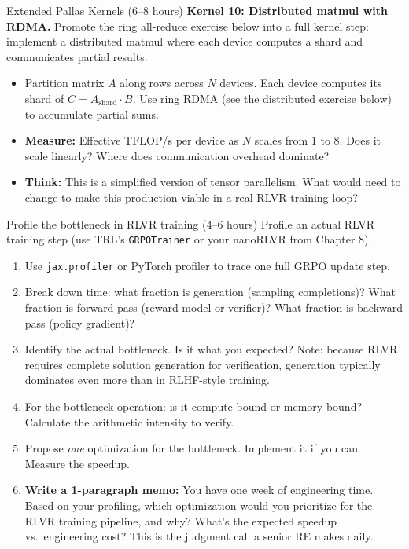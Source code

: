 \begin{exercise}{Extended Pallas Kernels (6--8 hours)}
\textbf{Kernel 10: Distributed matmul with RDMA.} Promote the ring all-reduce exercise below into a full kernel step: implement a distributed matmul where each device computes a shard and communicates partial results.

\begin{itemize}
  \item Partition matrix $A$ along rows across $N$ devices. Each device computes its shard of $C = A_{\text{shard}} \cdot B$. Use ring RDMA (see the distributed exercise below) to accumulate partial sums.
  \item \textbf{Measure:} Effective TFLOP/s per device as $N$ scales from 1 to 8. Does it scale linearly? Where does communication overhead dominate?
  \item \textbf{Think:} This is a simplified version of tensor parallelism. What would need to change to make this production-viable in a real RLVR training loop?
\end{itemize}
\end{exercise}

\begin{exercise}{Profile the bottleneck in RLVR training (4--6 hours)}
Profile an actual RLVR training step (use TRL's \texttt{GRPOTrainer} or your nanoRLVR from Chapter 8).

\begin{enumerate}
  \item Use \texttt{jax.profiler} or PyTorch profiler to trace one full GRPO update step.
  \item Break down time: what fraction is generation (sampling completions)? What fraction is forward pass (reward model or verifier)? What fraction is backward pass (policy gradient)?
  \item Identify the actual bottleneck. Is it what you expected? Note: because RLVR requires complete solution generation for verification, generation typically dominates even more than in RLHF-style training.
  \item For the bottleneck operation: is it compute-bound or memory-bound? Calculate the arithmetic intensity to verify.
  \item Propose \textit{one} optimization for the bottleneck. Implement it if you can. Measure the speedup.
  \item \textbf{Write a 1-paragraph memo:} You have one week of engineering time. Based on your profiling, which optimization would you prioritize for the RLVR training pipeline, and why? What's the expected speedup vs.\ engineering cost? This is the judgment call a senior RE makes daily.
\end{enumerate}

\end{exercise}

